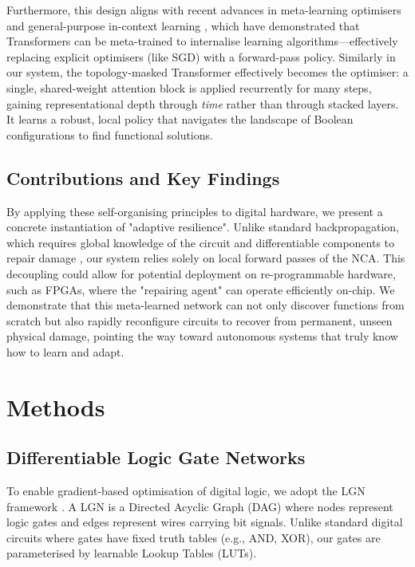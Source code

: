 Furthermore, this design aligns with recent advances in meta-learning optimisers and general-purpose in-context learning \citep{kirsch_meta_2022, kirsch_general-purpose_2024}, which have demonstrated that Transformers can be meta-trained to internalise learning algorithms---effectively replacing explicit optimisers (like SGD) with a forward-pass policy.
Similarly in our system, the topology-masked Transformer effectively becomes the optimiser: a single, shared-weight attention block is applied recurrently for many steps, gaining representational depth through \textit{time} rather than through stacked layers. It learns a robust, local policy that navigates the landscape of Boolean configurations to find functional solutions.

\subsection*{Contributions and Key Findings}
By applying these self-organising principles to digital hardware, we present a concrete instantiation of "adaptive resilience". Unlike standard backpropagation, which requires global knowledge of the circuit and differentiable components to repair damage \citep{sunada_blending_2025}, our system relies solely on local forward passes of the NCA.
This decoupling could allow for potential deployment on re-programmable hardware, such as FPGAs, where the "repairing agent" can operate efficiently on-chip.
We demonstrate that this meta-learned network can not only discover functions from scratch but also rapidly reconfigure circuits to recover from permanent, unseen physical damage, pointing the way toward autonomous systems that truly know how to learn and adapt.


\section{Methods}

\subsection{Differentiable Logic Gate Networks}
\label{sec:LGNs}
To enable gradient-based optimisation of digital logic, we adopt the \ac{LGN} framework \citep{petersen_deep_2022}.
A LGN is a Directed Acyclic Graph (DAG) where nodes represent logic gates and edges represent wires carrying bit signals. Unlike standard digital circuits where gates have fixed truth tables (e.g., AND, XOR), our gates are parameterised by learnable Lookup Tables (LUTs).

